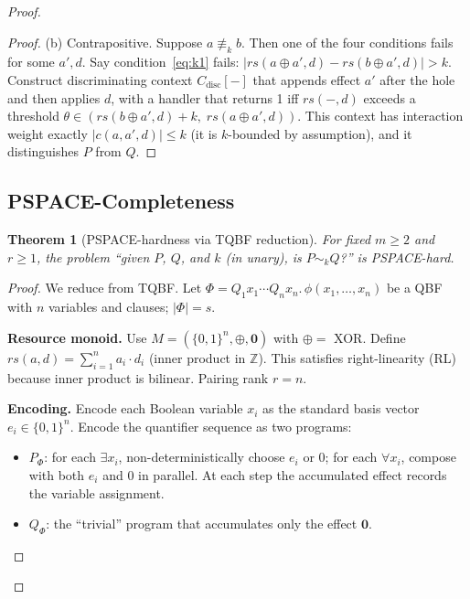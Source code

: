\documentclass[acmsmall,sigplan,anonymous,review,screen]{acmart}
\theoremstyle{plain}
\newtheorem{theorem}{Theorem}[section]
\theoremstyle{definition}
\newcommand{\rs}{\mathit{rs}}
\begin{document}
\begin{proof}
\begin{proof}
  (b) Contrapositive.  Suppose $a \not\equiv_k b$.  Then one of the four
  conditions fails for some $a', d$.  Say condition~\eqref{eq:k1} fails:
  $|\rs(a \oplus a', d) - \rs(b \oplus a', d)| > k$.
  Construct discriminating context $C_{\mathrm{disc}}[-]$ that appends
  effect $a'$ after the hole and then applies $d$, with a handler that
  returns 1 iff $\rs(-, d)$ exceeds a threshold $\theta \in (\rs(b \oplus
  a', d) + k,\; \rs(a \oplus a', d))$.  This context has interaction
  weight exactly $|c(a, a', d)| \leq k$ (it is $k$-bounded by assumption),
  and it distinguishes $P$ from $Q$.
\end{proof}

\subsection{PSPACE-Completeness}
\label{sec:decidability:pspace}

\begin{theorem}[PSPACE-hardness via TQBF reduction]
\label{thm:pspace}
  For fixed $m \geq 2$ and $r \geq 1$, the problem
  ``given $P$, $Q$, and $k$ (in unary), is $P \sim_k Q$?''
  is PSPACE-hard.
\end{theorem}

\begin{proof}
  We reduce from TQBF.  Let
  $\Phi = Q_1 x_1 \cdots Q_n x_n.\, \phi(x_1, \ldots, x_n)$
  be a QBF with $n$ variables and clauses; $|\Phi| = s$.

  \medskip
  \noindent\textbf{Resource monoid.}
  Use $M = (\{0,1\}^n, \oplus, \mathbf{0})$ with $\oplus = $ XOR.
  Define $\rs(a, d) = \sum_{i=1}^n a_i \cdot d_i$ (inner product in $\mathbb{Z}$).
  This satisfies right-linearity (RL) because inner product is bilinear.
  Pairing rank $r = n$.

  \medskip
  \noindent\textbf{Encoding.}
  Encode each Boolean variable $x_i$ as the standard basis vector
  $e_i \in \{0,1\}^n$.  Encode the quantifier sequence as two programs:
  \begin{itemize}[itemsep=2pt]
    \item $P_\Phi$: for each $\exists x_i$, non-deterministically choose
      $e_i$ or $0$; for each $\forall x_i$, compose with both $e_i$ and
      $0$ in parallel.  At each step the accumulated effect records the
      variable assignment.
    \item $Q_\Phi$: the ``trivial'' program that accumulates only the
      effect $\mathbf{0}$.
  \end{itemize}


\end{proof}
\end{proof}
\end{document}
